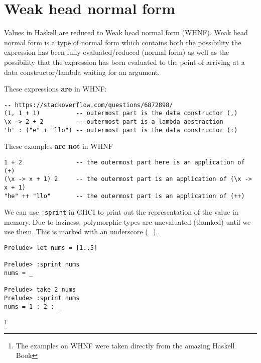 \section{Weak head normal form}

Values in Haskell are reduced to Weak head normal form (WHNF).
Weak head normal form is a type of normal form which contains both the possibility the expression has been fully evaluated/reduced (normal form) as well as the possibility that the expression has been evaluated to the point of arriving at a data constructor/lambda waiting for an argument.

These expressions \textbf{are} in WHNF:

\begin{lstlisting}[linewidth=15cm]
-- https://stackoverflow.com/questions/6872898/
(1, 1 + 1)          -- outermost part is the data constructor (,)
\x -> 2 + 2         -- outermost part is a lambda abstraction
'h' : ("e" + "llo") -- outermost part is the data constructor (:)
\end{lstlisting}

These examples \textbf{are not} in WHNF
\begin{lstlisting}[linewidth=15cm]
1 + 2               -- the outermost part here is an application of (+)
(\x -> x + 1) 2     -- the outermost part is an application of (\x -> x + 1)
"he" ++ "llo"       -- the outermost part is an application of (++)    
\end{lstlisting}

We can use \texttt{:sprint} in GHCI to print out the representation of the value in memory. Due to laziness, polymorphic types are unevaluated (thunked) until we use them. This is marked with an underscore (\_).

\begin{verbatim}
Prelude> let nums = [1..5]

Prelude> :sprint nums
nums = _

Prelude> take 2 nums
Prelude> :sprint nums
nums = 1 : 2 : _
\end{verbatim}

\footnote{The examples on WHNF were taken directly from the amazing Haskell Book}